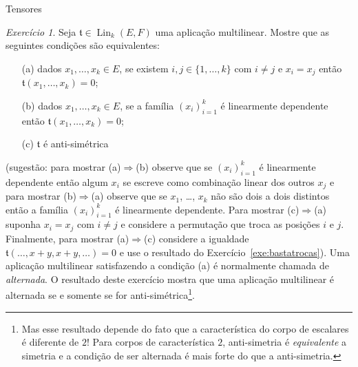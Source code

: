 \documentclass[oneside,11pt]{amsart}
\DeclareMathOperator{\Lin}{Lin}
\theoremstyle{remark}\newtheorem{exercise}{Exercício}[section]
\theoremstyle{plain}\newtheorem{teo}{Teorema}[section]
\theoremstyle{plain}\newtheorem{lem}[teo]{Lema}
\theoremstyle{plain}\newtheorem{prop}[teo]{Proposição}
\theoremstyle{definition}\newtheorem{defin}[teo]{Definição}
\theoremstyle{remark}\newtheorem{rem}[teo]{Observação}
\theoremstyle{definition}\newtheorem{example}[teo]{Exemplo}
\numberwithin{equation}{section}
\begin{document}
\begin{section}{Tensores}
\begin{exercise}\label{exe:antisimetricaalternada}
Seja $\mathfrak t\in\Lin_k(E,F)$ uma aplicação multilinear. Mostre que as seguintes condições são equivalentes:
\begin{itemize}
\item[(a)] dados $x_1,\ldots,x_k\in E$, se existem $i,j\in\{1,\ldots,k\}$ com $i\ne j$ e $x_i=x_j$ então $\mathfrak t(x_1,\ldots,x_k)=0$;
\item[(b)] dados $x_1,\ldots,x_k\in E$, se a família $(x_i)_{i=1}^k$ é linearmente dependente então $\mathfrak t(x_1,\ldots,x_k)=0$;
\item[(c)] $\mathfrak t$ é anti-simétrica
\end{itemize}
(sugestão: para mostrar (a)$\Rightarrow$(b) observe que se $(x_i)_{i=1}^k$ é linearmente dependente então algum $x_i$ se escreve como combinação
linear dos outros $x_j$ e para mostrar (b)$\Rightarrow$(a) observe que se $x_1$, \dots, $x_k$ não são dois a dois distintos então a família
$(x_i)_{i=1}^k$ é linearmente dependente. Para mostrar (c)$\Rightarrow$(a) suponha $x_i=x_j$ com $i\ne j$ e considere a permutação que troca as posições $i$
e $j$. Finalmente, para mostrar (a)$\Rightarrow$(c) considere a igualdade $\mathfrak t(\ldots,x+y,x+y,\ldots)=0$ e use o resultado do Exercício~\ref{exe:bastatrocas}).
Uma aplicação multilinear satisfazendo a condição (a) é normalmente chamada de {\em alternada}. O resultado deste exercício mostra que uma aplicação multilinear
é alternada se e somente se for anti-simétrica\footnote{%
Mas esse resultado depende do fato que a característica do corpo de escalares é diferente de $2$! Para corpos
de característica $2$, anti-simetria é {\em equivalente\/} a simetria e a condição de ser alternada é mais forte do que a anti-simetria.}.
\end{exercise}


\end{section}
\end{document}
